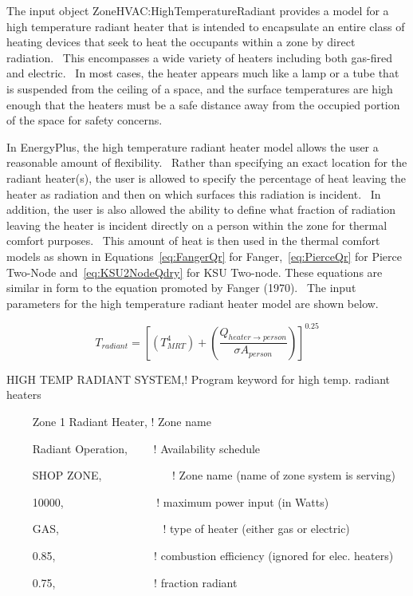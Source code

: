 {The input object ZoneHVAC:HighTemperatureRadiant provides a model for a high temperature radiant heater that is intended to encapsulate an entire class of heating devices that seek to heat the occupants within a zone by direct radiation.~ This encompasses a wide variety of heaters including both gas-fired and electric.~ In most cases, the heater appears much like a lamp or a tube that is suspended from the ceiling of a space, and the surface temperatures are high enough that the heaters must be a safe distance away from the occupied portion of the space for safety concerns.

In EnergyPlus, the high temperature radiant heater model allows the user a reasonable amount of flexibility.~ Rather than specifying an exact location for the radiant heater(s), the user is allowed to specify the percentage of heat leaving the heater as radiation and then on which surfaces this radiation is incident.~ In addition, the user is also allowed the ability to define what fraction of radiation leaving the heater is incident directly on a person within the zone for thermal comfort purposes.~ This amount of heat is then used in the thermal comfort models as shown in Equations~\ref{eq:FangerQr} for Fanger,~\ref{eq:PierceQr} for Pierce Two-Node and~\ref{eq:KSU2NodeQdry} for KSU Two-node. These equations are similar in form to the equation promoted by Fanger (1970).~ The input parameters for the high temperature radiant heater model are shown below.

\begin{equation}
{T_{radiant}} = {\left[ {\left( {T_{MRT}^4} \right) + \left( {\frac{{{Q_{heater \to person}}}}{{\sigma {A_{person}}}}} \right)} \right]^{0.25}}
\label{eq:HighTempRadSysTradiant}
\end{equation}

HIGH TEMP RADIANT SYSTEM,! Program keyword for high temp. radiant heaters

~~~~ Zone 1 Radiant Heater, ! Zone name

~~~~ Radiant Operation,~~~~ ! Availability schedule

~~~~ SHOP ZONE,~~~~~~~~~~~~ ! Zone name (name of zone system is serving)

~~~~ 10000,~~~~~~~~~~~~~~~~ ! maximum power input (in Watts)

~~~~ GAS,~~~~~~~~~~~~~~~~~~ ! type of heater (either gas or electric)

~~~~ 0.85,~~~~~~~~~~~~~~~~~ ! combustion efficiency (ignored for elec. heaters)

~~~~ 0.75,~~~~~~~~~~~ ~~~~~~! fraction radiant

}
